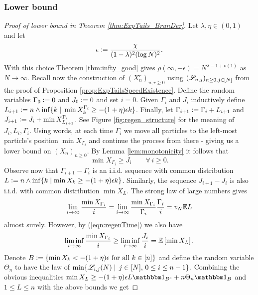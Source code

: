 \subsubsection{Lower bound}\label{subsec:lower_bound}
\begin{proof}[Proof of lower bound in Theorem \ref{thm:ExpTails_BrunDer}]

Let $\lambda, \eta \in (0,1)$ and let 
\begin{equation}\nonumber
\epsilon \vcentcolon= \frac{\chi}{(1-\lambda)^2(\log N)^2}. 
\end{equation}
With this choice Theorem \ref{thm:infty_good} gives $\rho(\infty, - \epsilon) = N^{\lambda - 1 + o(1)}$ as $N \to \infty$. Recall now the construction of $(X^r_n)_{n, r \geq 0}$ using $(\mathscr{L}_{n, j})_{n \geq 0, j \in [N]}$ from the proof of Proposition \ref{prop:ExpTailsSpeedExistence}. Define the random variables $\Gamma_0 \vcentcolon= 0$ and $J_0 \vcentcolon= 0$ and set $i = 0$. Given $\Gamma_i$ and $J_i$ inductively define $L_{i+1} \vcentcolon= n \land \inf\{ k \mid\, \min X^{\Gamma_i}_k \geq -(1+\eta)\epsilon k\}$. Finally, let $\Gamma_{i+1} \vcentcolon= \Gamma_i + L_{i+1}$ and $J_{i+1} \vcentcolon= J_i + \min X^{\Gamma_i}_{L_{i+1}}$. See Figure \ref{fig:regen_structure} for the meaning of $J_i, L_i, \Gamma_i$. Using words, at each time $\Gamma_i$ we move all particles to the left-most particle's position $\min X_{\Gamma_i}$ and continue the process from there - giving us a lower bound on $(X_n)_{n \geq 0}$. By Lemma \ref{lem:monotonicity} it follows that 
\begin{equation}\label{eqn:regenTime}
\min X_{\Gamma_i} \geq J_i \qquad\forall\, i \geq 0. 
\end{equation}
Observe now that $\Gamma_{i+1} - \Gamma_i$ is an i.i.d. sequence with common distribution $L \vcentcolon= n \land \inf \{ k \mid \min X_k \geq - (1+\eta)\epsilon k\}$. Similarly, the sequence $J_{i+1} - J_i$ is also i.i.d. with common distribution $\min X_L$. The strong law of large numbers gives 
\begin{equation}\nonumber
\lim\limits_{i \to \infty} \frac{\min X_{\Gamma_i}}{i} = \lim\limits_{i \to \infty} \frac{\min X_{\Gamma_i}}{\Gamma_i} \frac{\Gamma_i}{i} = v_N \mathbb{E} L
\end{equation}
almost surely. However, by (\ref{eqn:regenTime}) we also have
\begin{equation}\nonumber
\liminf\limits_{i \to \infty} \frac{\min X_{\Gamma_i}}{i} \geq \liminf\limits_{i \to \infty} \frac{J_i}{i} = \mathbb{E}\left[ \min X_L \right].
\end{equation}
Denote $B \vcentcolon= \{ \min X_k < - (1+\eta)\epsilon \text{ for all } k \in [n]\}$ and define the random variable $\Theta_n$ to have the law of $\min \{\mathscr{L}_{i, j}(N) \mid\, j \in [N],\, 0 \leq i \leq n - 1 \}$. Combining the obvious inequalities $\min X_L \geq -(1 + \eta)\epsilon L \Ind_{B^c} + n \Theta_n \Ind_B$ and $1 \leq L \leq n$ with the above bounds we get

\end{proof}
